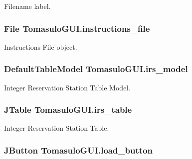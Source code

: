 \-Filename label. 

\hypertarget{classTomasuloGUI_a84fcf1ebe8e65d62c3c7f90382380946}{
\subsubsection[{instructions\-\_\-file}]{\setlength{\rightskip}{0pt plus 5cm}\-File {\bf \-Tomasulo\-G\-U\-I.\-instructions\-\_\-file}}}\label{classTomasuloGUI_a84fcf1ebe8e65d62c3c7f90382380946}


\-Instructions \-File object. 

\hypertarget{classTomasuloGUI_a2dc4ffde9e3f919d756d89fbfd5aac46}{
\subsubsection[{irs\-\_\-model}]{\setlength{\rightskip}{0pt plus 5cm}\-Default\-Table\-Model {\bf \-Tomasulo\-G\-U\-I.\-irs\-\_\-model}}}\label{classTomasuloGUI_a2dc4ffde9e3f919d756d89fbfd5aac46}


\-Integer \-Reservation \-Station \-Table \-Model. 

\hypertarget{classTomasuloGUI_a0ef75f51c2dc43b3fc667bb1289d6cc0}{
\subsubsection[{irs\-\_\-table}]{\setlength{\rightskip}{0pt plus 5cm}\-J\-Table {\bf \-Tomasulo\-G\-U\-I.\-irs\-\_\-table}}}\label{classTomasuloGUI_a0ef75f51c2dc43b3fc667bb1289d6cc0}


\-Integer \-Reservation \-Station \-Table. 

\hypertarget{classTomasuloGUI_ad94e3aa704e880a905631076935771a5}{
\subsubsection[{load\-\_\-button}]{\setlength{\rightskip}{0pt plus 5cm}\-J\-Button {\bf \-Tomasulo\-G\-U\-I.\-load\-\_\-button}}}\label{classTomasuloGUI_ad94e3aa704e880a905631076935771a5}


